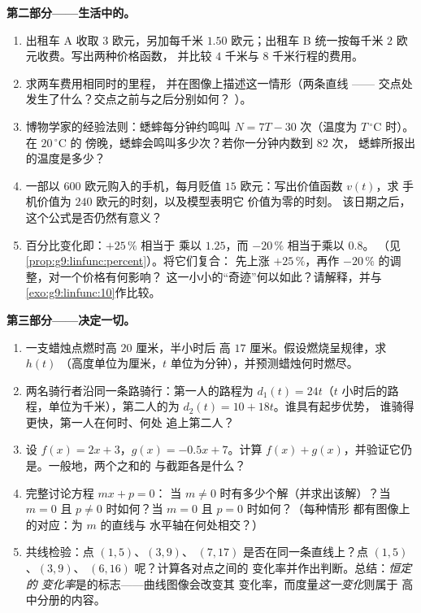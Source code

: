 \begin{problem}
\medskip
\noindent\textbf{第二部分——生活中的。}
\begin{enumerate}[resume]
  \item 出租车 A 收取 $3$ 欧元，另加每千米 $1.50$ 欧元；出租车 B
        统一按每千米 $2$ 欧元收费。写出两种价格函数，
        并比较 $4$ 千米与
        $8$ 千米行程的费用。
  \item 求两车费用相同时的里程，
        并在图像上描述这一情形（两条直线 ——
        交点处发生了什么？交点之前与之后分别如何？
        ）。
  \item 博物学家的经验法则：蟋蟀每分钟约鸣叫
        $N = 7T - 30$ 次（温度为
        $T\,^\circ$C 时）。在 $20\,^\circ$C 的
        傍晚，蟋蟀会鸣叫多少次？若你一分钟内数到 $82$ 次，
        蟋蟀所报出的温度是多少？
  \item 一部以 $600$ 欧元购入的手机，每月贬值
        $15$ 欧元：写出价值函数 $v(t)$，求
        手机价值为 $240$ 欧元的时刻，以及模型表明它
        价值为零的时刻。
        该日期之后，这个公式是否仍然有意义？
  \item 百分比变化即：$+25\,\%$ 相当于
        乘以 $1.25$，而 $-20\,\%$ 相当于乘以 $0.8$。
        （见\cref{prop:g9:linfunc:percent}）。将它们复合：
        先上涨 $+25\,\%$，再作 $-20\,\%$ 的调整，对一个价格有何影响？
        这一小小的“奇迹”何以如此？请解释，并与
        \cref{exo:g9:linfunc:10}作比较。
\end{enumerate}

\medskip
\noindent\textbf{第三部分——决定一切。}
\begin{enumerate}[resume]
  \item 一支蜡烛点燃时高 $20$ 厘米，半小时后
        高 $17$ 厘米。假设燃烧呈规律，求 $h(t)$
        （高度单位为厘米，$t$ 单位为分钟），并预测蜡烛何时燃尽。
  \item 两名骑行者沿同一条路骑行：第一人的路程为
        $d_1(t) = 24t$（$t$ 小时后的路程，单位为千米），第二人的为
        $d_2(t) = 10 + 18t$。谁具有起步优势，
        谁骑得更快，第一人在何时、何处
        追上第二人？
  \item 设 $f(x) = 2x + 3$，$g(x) = -0.5x + 7$。计算
        $f(x) + g(x)$，并验证它仍是。一般地，两个之和的
        与截距各是什么？
  \item 完整讨论方程 $mx + p = 0$：
        当 $m \neq 0$ 时有多少个解（并求出该解）？当 $m = 0$
        且 $p \neq 0$ 时如何？当 $m = 0$ 且 $p = 0$ 时如何？（每种情形
        都有图像上的对应：为 $m$ 的直线与
        水平轴在何处相交？）
  \item 共线检验：点 $(1, 5)$、$(3, 9)$、
        $(7, 17)$ 是否在同一条直线上？点 $(1, 5)$、$(3, 9)$、
        $(6, 16)$ 呢？计算各对点之间的
        变化率并作出判断。总结：\emph{恒定的
        变化率}是的标志——曲线图像会改变其
        变化率，而度量\emph{这一变化}则属于
        高中分册的内容。
\end{enumerate}
\end{problem}
